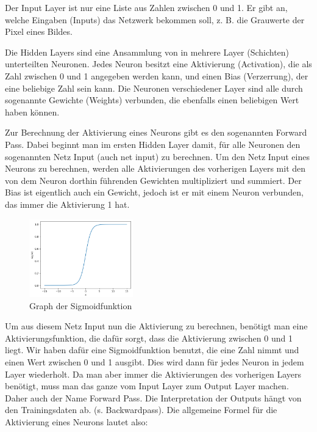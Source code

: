 \documentclass{scrartcl}
\begin{document}
	Der Input Layer ist nur eine Liste aus Zahlen zwischen 0 und 1. Er gibt an, welche Eingaben (Inputs) das Netzwerk bekommen soll, z. B. die Grauwerte der Pixel eines Bildes.

	Die Hidden Layers sind eine Ansammlung von in mehrere Layer (Schichten) unterteilten Neuronen. Jedes Neuron besitzt eine Aktivierung (Activation), die als Zahl zwischen 0 und 1 angegeben werden kann, und einen Bias (Verzerrung), der eine beliebige Zahl sein kann. Die Neuronen verschiedener Layer sind alle durch sogenannte Gewichte (Weights) verbunden, die ebenfalls einen beliebigen Wert haben können.  


	Zur Berechnung der Aktivierung eines Neurons gibt es den sogenannten Forward Pass. Dabei beginnt man im ersten Hidden Layer damit, für alle Neuronen den sogenannten Netz Input (auch net input) zu berechnen. Um den Netz Input eines Neurons zu berechnen, werden alle Aktivierungen des vorherigen Layers mit den von dem Neuron dorthin führenden Gewichten multipliziert und summiert. Der Bias ist eigentlich auch ein Gewicht, jedoch ist er mit einem Neuron verbunden, das immer die Aktivierung 1 hat.

	\begin{figure}
		\centering
		\includegraphics[width=0.4\textwidth]{pictures/sig_func.png}
		\caption{Graph der Sigmoidfunktion}
	\end{figure}

	Um aus diesem Netz Input nun die Aktivierung zu berechnen, benötigt man eine Aktivierungsfunktion, die dafür sorgt, dass die Aktivierung zwischen 0 und 1 liegt. Wir haben dafür eine Sigmoidfunktion benutzt, die eine Zahl nimmt und einen Wert zwischen 0 und 1 ausgibt. Dies wird dann für jedes Neuron in jedem Layer wiederholt. Da man aber immer die Aktivierungen des vorherigen Layers benötigt, muss man das ganze vom Input Layer zum Output Layer machen. Daher auch der Name Forward Pass. Die Interpretation der Outputs hängt von den Trainingsdaten ab. (s. Backwardpass). Die allgemeine Formel für die Aktivierung eines Neurons lautet also:
	
\end{document}
